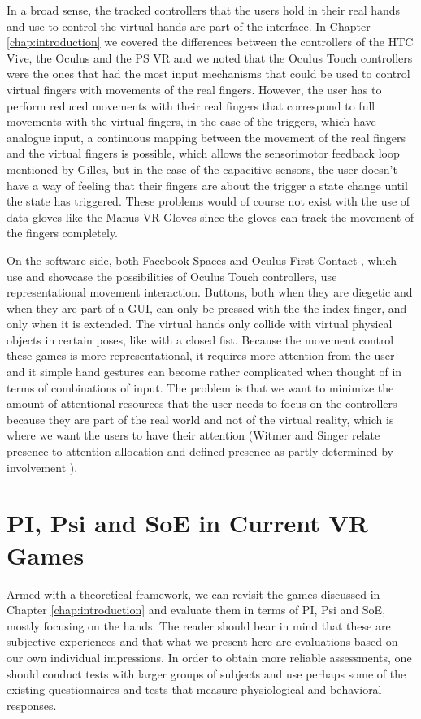 In a broad sense, the tracked controllers that the users hold in their real hands and use to control the virtual hands are part of the interface. In Chapter \ref{chap:introduction} we covered the differences between the controllers of the HTC Vive, the Oculus and the PS VR and we noted that the Oculus Touch controllers were the ones that had the most input mechanisms that could be used to control virtual fingers with movements of the real fingers. However, the user has to perform reduced movements with their real fingers that correspond to full movements with the virtual fingers, in the case of the triggers, which have analogue input, a continuous mapping between the movement of the real fingers and the virtual fingers is possible, which allows the sensorimotor feedback loop mentioned by Gilles, but in the case of the capacitive sensors, the user doesn't have a way of feeling that their fingers are about the trigger a state change until the state has triggered. These problems would of course not exist with the use of data gloves like the Manus VR Gloves since the gloves can track the movement of the fingers completely.

On the software side, both Facebook Spaces \parencite{facebookSpaces} and Oculus First Contact \parencite{firstContact}, which use and showcase the possibilities of Oculus Touch controllers, use representational movement interaction. Buttons, both when they are diegetic and when they are part of a GUI, can only be pressed with the the index finger, and only when it is extended. The virtual hands only collide with virtual physical objects in certain poses, like with a closed fist. Because the movement control these games is more representational, it requires more attention from the user and it simple hand gestures can become rather complicated when thought of in terms of combinations of input. The problem is that we want to minimize the amount of attentional resources that the user needs to focus on the controllers because they are part of the real world and not of the virtual reality, which is where we want the users to have their attention (Witmer and Singer relate presence to attention allocation and defined presence as partly determined by involvement \parencite{Schuemie2001}).

\section{PI, Psi and SoE in Current VR Games}
\label{sec:soaRevisited}

Armed with a theoretical framework, we can revisit the games discussed in Chapter \ref{chap:introduction} and evaluate them in terms of PI, Psi and SoE, mostly focusing on the hands. The reader should bear in mind that these are subjective experiences and that what we present here are evaluations based on our own individual impressions. In order to obtain more reliable assessments, one should conduct tests with larger groups of subjects and use perhaps some of the existing questionnaires and tests that measure physiological and behavioral responses.

